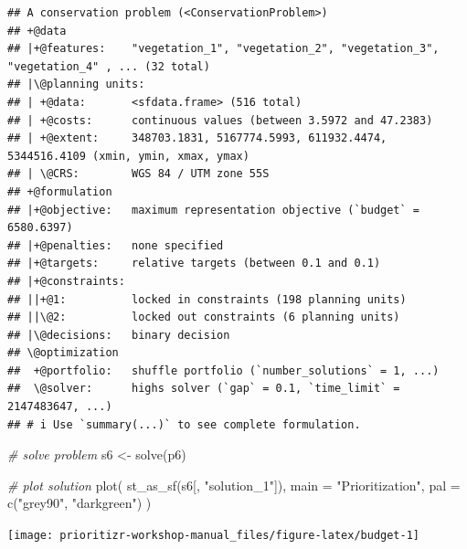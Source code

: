 \documentclass[
  12pt,
]{book}
\newenvironment{Shaded}{\begin{snugshade}}{\end{snugshade}}
\newcommand{\AttributeTok}[1]{\textcolor[rgb]{0.77,0.63,0.00}{#1}}
\newcommand{\CommentTok}[1]{\textcolor[rgb]{0.56,0.35,0.01}{\textit{#1}}}
\newcommand{\ConstantTok}[1]{\textcolor[rgb]{0.00,0.00,0.00}{#1}}
\newcommand{\FloatTok}[1]{\textcolor[rgb]{0.00,0.00,0.81}{#1}}
\newcommand{\FunctionTok}[1]{\textcolor[rgb]{0.00,0.00,0.00}{#1}}
\newcommand{\NormalTok}[1]{#1}
\newcommand{\OtherTok}[1]{\textcolor[rgb]{0.56,0.35,0.01}{#1}}
\newcommand{\SpecialCharTok}[1]{\textcolor[rgb]{0.00,0.00,0.00}{#1}}
\newcommand{\StringTok}[1]{\textcolor[rgb]{0.31,0.60,0.02}{#1}}
\begin{document}
\begin{verbatim}
## A conservation problem (<ConservationProblem>)
## +@data
## |+@features:    "vegetation_1", "vegetation_2", "vegetation_3", "vegetation_4" , ... (32 total)
## |\@planning units:
## | +@data:       <sfdata.frame> (516 total)
## | +@costs:      continuous values (between 3.5972 and 47.2383)
## | +@extent:     348703.1831, 5167774.5993, 611932.4474, 5344516.4109 (xmin, ymin, xmax, ymax)
## | \@CRS:        WGS 84 / UTM zone 55S
## +@formulation
## |+@objective:   maximum representation objective (`budget` = 6580.6397)
## |+@penalties:   none specified
## |+@targets:     relative targets (between 0.1 and 0.1)
## |+@constraints:
## ||+@1:          locked in constraints (198 planning units)
## ||\@2:          locked out constraints (6 planning units)
## |\@decisions:   binary decision
## \@optimization
##  +@portfolio:   shuffle portfolio (`number_solutions` = 1, ...)
##  \@solver:      highs solver (`gap` = 0.1, `time_limit` = 2147483647, ...)
## # i Use `summary(...)` to see complete formulation.
\end{verbatim}

\begin{Shaded}
\begin{Highlighting}[]
\CommentTok{\# solve problem}
\NormalTok{s6 }\OtherTok{\textless{}{-}} \FunctionTok{solve}\NormalTok{(p6)}

\CommentTok{\# plot solution}
\FunctionTok{plot}\NormalTok{(}
  \FunctionTok{st\_as\_sf}\NormalTok{(s6[, }\StringTok{"solution\_1"}\NormalTok{]), }\AttributeTok{main =} \StringTok{"Prioritization"}\NormalTok{,}
  \AttributeTok{pal =} \FunctionTok{c}\NormalTok{(}\StringTok{"grey90"}\NormalTok{, }\StringTok{"darkgreen"}\NormalTok{)}
\NormalTok{)}
\end{Highlighting}
\end{Shaded}

\begin{center}\texttt{[image: prioritizr-workshop-manual\_files/figure-latex/budget-1]} \end{center}

\begin{Shaded}
\end{Shaded}
\end{document}
